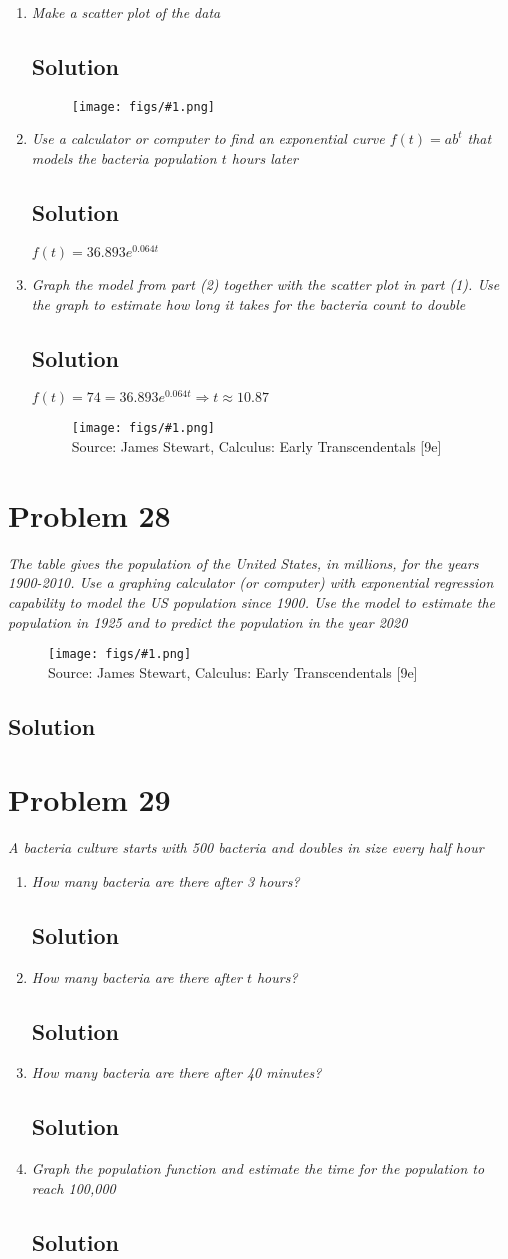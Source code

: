 \documentclass[11pt]{article}
\newcommand{\soln}{\subsection*}
\newcommand{\qn}{\textit}
\newcommand{\imagesource}[1]{{\footnotesize Source: #1}}
\newcommand{\imgqn}[1]{
	\begin{figure}[H]
		\centering
		\texttt{[image: figs/\#1.png]}\\
		\imagesource{James Stewart, Calculus: Early Transcendentals [9e]}
	\end{figure}
}
\newcommand{\imgsoln}[1]{
	\begin{figure}[H]
		\centering
		\texttt{[image: figs/\#1.png]}
	\end{figure}
}
\begin{document}
\begin{enumerate}
	\item \qn{Make a scatter plot of the data}
	\soln{Solution}
	\imgsoln{1.4.27-ans.a}
	
	\item \qn{Use a calculator or computer to find an exponential curve $f(t)=ab^t$ that models the bacteria population $t$ hours later}
	\soln{Solution}
	$f(t)=36.893e^{0.064t}$
	
	\item \qn{Graph the model from part (2) together with the scatter plot in part (1). Use the graph to estimate how long it takes for the bacteria count to double}
	\soln{Solution}
	$f(t)=74=36.893e^{0.064t} \Rightarrow t \approx 10.87$
	\imgqn{1.4.27.c}
\end{enumerate}

\section*{Problem 28}

\qn{The table gives the population of the United States, in millions, for the years 1900-2010. Use a graphing calculator (or computer) with exponential regression capability to model the US population since 1900. Use the model to estimate the population in 1925 and to predict the population in the year 2020}
\imgqn{1.4.28}

\soln{Solution}

\section*{Problem 29}

\qn{A bacteria culture starts with 500 bacteria and doubles in size every half hour}

\begin{enumerate}
	\item \qn{How many bacteria are there after 3 hours?}
	\soln{Solution}
	
	\item \qn{How many bacteria are there after $t$ hours?}
	\soln{Solution}
	
	\item \qn{How many bacteria are there after 40 minutes?}
	\soln{Solution}
	
	\item \qn{Graph the population function and estimate the time for the population to reach 100,000}
	\soln{Solution}
\end{enumerate}
\end{document}
